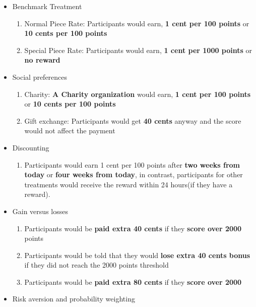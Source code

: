 \documentclass[11pt
]{article}
\begin{document}
\begin{itemize}
\item
  Benchmark Treatment

  \begin{enumerate}
  \def\labelenumi{\arabic{enumi}.}
  \item
    Normal Piece Rate: Participants would earn, \textbf{1 cent per 100
    points} or \textbf{10 cents per 100 points}
  \item
    Special Piece Rate: Participants would earn, \textbf{1 cent per 1000
    points} or \textbf{no reward}
  \end{enumerate}
\item
  Social preferences

  \begin{enumerate}
  \def\labelenumi{\arabic{enumi}.}
  \item
    Charity: \textbf{A Charity organization} would earn, \textbf{1 cent
    per 100 points} or \textbf{10 cents per 100 points}
  \item
    Gift exchange: Participants would get \textbf{40 cents} anyway and
    the score would not affect the payment
  \end{enumerate}
\item
  Discounting

  \begin{enumerate}
  \def\labelenumi{\arabic{enumi}.}
  \item
    Participants would earn 1 cent per 100 points after \textbf{two weeks
    from today} or \textbf{four weeks from today}, in contrast,
    participants for other treatments would receive the reward within 24
    hours(if they have a reward).
  \end{enumerate}
\item
  Gain versus losses

  \begin{enumerate}
  \def\labelenumi{\arabic{enumi}.}
  \item
    Participants would be \textbf{paid extra 40 cents} if they
    \textbf{score over 2000} points
  \item
    Participants would be told that they would \textbf{lose extra 40
    cents bonus} if they did not reach the 2000 points threshold
  \item
    Participants would be \textbf{paid extra 80 cents} if they
    \textbf{score over 2000}
  \end{enumerate}
\item
  Risk aversion and probability weighting


\end{itemize}
\end{document}
